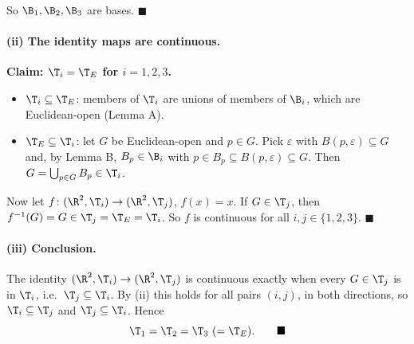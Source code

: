 So $\B_1,\B_2,\B_3$ are bases. $\blacksquare$

\paragraph{(ii) The identity maps are continuous.}
\textbf{Claim: $\T_i=\T_E$ for $i=1,2,3$.}
\begin{itemize}[nosep]
  \item $\T_i\subseteq\T_E$: members of $\T_i$ are unions of members of $\B_i$, which are
        Euclidean-open (Lemma A).
  \item $\T_E\subseteq\T_i$: let $G$ be Euclidean-open and $p\in G$. Pick $\varepsilon$ with
        $B(p,\varepsilon)\subseteq G$ and, by Lemma B, $B_p\in\B_i$ with
        $p\in B_p\subseteq B(p,\varepsilon)\subseteq G$. Then $G=\bigcup_{p\in G}B_p\in\T_i$.
\end{itemize}
Now let $f\colon(\R^2,\T_i)\to(\R^2,\T_j)$, $f(x)=x$. If $G\in\T_j$, then
$f^{-1}(G)=G\in\T_j=\T_E=\T_i$. So $f$ is continuous for all $i,j\in\{1,2,3\}$.
$\blacksquare$

\paragraph{(iii) Conclusion.}
The identity $(\R^2,\T_i)\to(\R^2,\T_j)$ is continuous exactly when every $G\in\T_j$ is in
$\T_i$, i.e.\ $\T_j\subseteq\T_i$. By (ii) this holds for all pairs $(i,j)$, in both
directions, so $\T_i\subseteq\T_j$ and $\T_j\subseteq\T_i$. Hence
\[ \T_1=\T_2=\T_3\ (=\T_E).\qquad\blacksquare \]
